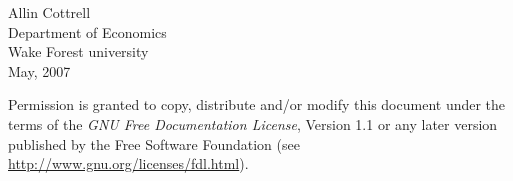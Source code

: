 \documentclass[oneside]{book}
\begin{document}
\VerbatimFootnotes

\setlength{\parindent}{0pt}
\setlength{\parskip}{1ex}



\thispagestyle{empty}

\begin{center}



{\large \sffamily 
Allin Cottrell\\
Department of Economics\\
Wake Forest university\\
\vspace{20pt}
May, 2007}

\end{center}
\clearpage


\thispagestyle{empty}


\vspace*{2in}

Permission is granted to copy, distribute and/or modify this document
under the terms of the \emph{GNU Free Documentation License}, Version
1.1 or any later version published by the Free Software Foundation
(see \url{http://www.gnu.org/licenses/fdl.html}).

\clearpage


\pagestyle{headings}

\tableofcontents

\clearpage
{}



\end{document}
